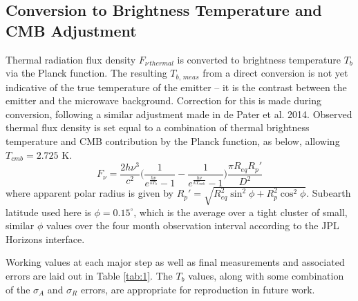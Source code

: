 \documentclass{article}
\newcommand{\expon}[1]{e^{#1}}
\begin{document}
\subsection{Conversion to Brightness Temperature and CMB Adjustment} %
	
	Thermal radiation flux density $F_{\nu\,thermal}$ is converted to brightness temperature $T_b$ via the Planck function.
	The resulting $T_{b,\,meas}$ from a direct conversion is not yet indicative of the true temperature of the emitter -- it is the contrast between the emitter and the microwave background.
	Correction for this is made during conversion, following a similar adjustment made in de Pater et al. 2014.
	Observed thermal flux density is set equal to a combination of thermal brightness temperature and CMB contribution by the Planck function, as below, allowing $T_{cmb} = 2.725$ K.
	$$ F_{\nu} = \frac{2h\nu^3}{c^2}\Bigg( \frac{1}{\expon{\frac{h\nu}{kT_b}} - 1} - \frac{1}{\expon{\frac{h\nu}{kT_{cmb}}} - 1} \Bigg)
		\frac{\pi R_{eq} R_{p}'}{D^2} $$
	where apparent polar radius is given by $R_{p}' = \sqrt{R_{eq}^{2}\sin^{2}{\phi} + R_{p}^{2}\cos^{2}{\phi}}$.
	Subearth latitude used here is $\phi = 0.15^{\circ}$, which is the average over a tight cluster of
	small, similar $\phi$ values over the four month observation interval according to the JPL Horizons interface.

	Working values at each major step as well as final measurements and associated errors are laid out in Table \ref{tab:1}.
	The $T_b$ values, along with some combination of the $\sigma_{A}$ and $\sigma_{R}$ errors, are appropriate for reproduction in future work.
\end{document}
